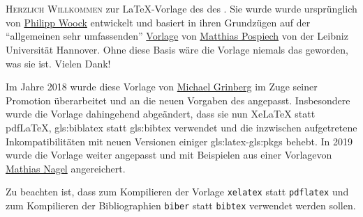 \chapter*{\TransAcknowledgements}
%
%
%
\markboth{\TransAcknowledgements}{\TransAcknowledgements}
%
%
\lettrine[nindent=0.2em]{H}{erzlich Willkommen} zur \LaTeX-Vorlage
des  %
des . %
Sie wurde wurde ursprünglich von
\href{http://ies.anthropomatik.kit.edu/mitarbeiter.php?person=woock}{Philipp Woock}
entwickelt und basiert in ihren Grundzügen auf der \enquote{allgemeinen sehr umfassenden}
\href{http://www.matthiaspospiech.de/latex/templates/thesis/}{Vorlage} von 
\href{http://www.matthiaspospiech.de}{Matthias Pospiech} von der Leibniz Universität Hannover.
Ohne diese Basis wäre die Vorlage niemals das geworden, was sie ist. Vielen Dank!

Im Jahre 2018 wurde diese Vorlage von
\href{http://ies.anthropomatik.kit.edu/mitarbeiter.php?person=grinberg}{Michael Grinberg}
im Zuge seiner Promotion überarbeitet und an die neuen Vorgaben des  angepasst.
Insbesondere wurde die Vorlage dahingehend abgeändert, dass sie nun XeLaTeX statt pdfLaTeX, 
\gls{gls:biblatex} statt \gls{gls:bibtex} verwendet und die inzwischen aufgetretene
Inkompatibilitäten mit neuen Versionen einiger \gls{gls:latex}-\glspl{gls:pkg} behebt.
In 2019 wurde die Vorlage weiter angepasst und mit Beispielen aus einer Vorlagevon
\href{https://crypto.iti.kit.edu/index.php?id=nagel}{Mathias Nagel} angereichert.

Zu beachten ist, dass zum Kompilieren der Vorlage \texttt{xelatex} statt \texttt{pdflatex}
und zum Kompilieren der Bibliographien \texttt{biber} statt \texttt{bibtex} verwendet werden sollen.